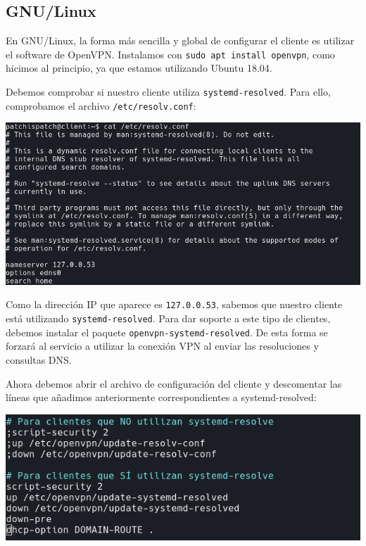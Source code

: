 \documentclass[11pt,a4paper]{article}
\begin{document}
\subsection{GNU/Linux}

En GNU/Linux, la forma más sencilla y global de configurar el cliente es utilizar el software de OpenVPN. Instalamos con \texttt{sudo apt install openvpn}, como hicimos al principio, ya que estamos utilizando Ubuntu 18.04.

\medskip

Debemos comprobar si nuestro cliente utiliza \texttt{systemd-resolved}. Para ello, comprobamos el archivo \texttt{/etc/resolv.conf}:

\medskip

\begin{center}
\includegraphics[scale=0.4]{resolv-conf.png}
\end{center}

\medskip

Como la dirección IP que aparece es \texttt{127.0.0.53}, sabemos que nuestro cliente está utilizando \texttt{systemd-resolved}. Para dar soporte a este tipo de clientes, debemos instalar el paquete \texttt{openvpn-systemd-resolved}. De esta forma se forzará al servicio a utilizar la conexión VPN al enviar las resoluciones y consultas DNS.

\medskip

Ahora debemos abrir el archivo de configuración del cliente y descomentar las líneas que añadimos anteriormente correspondientes a systemd-resolved:

\medskip

\begin{center}
\includegraphics[scale=0.4]{uncomment-systemd-resolved.png}
\end{center}
\end{document}
